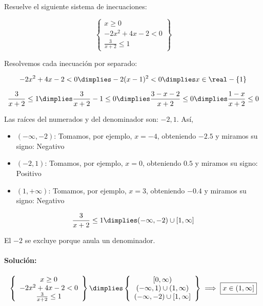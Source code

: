 \documentclass[palatino,nosec,nochap,nobuilddate]{Docencia}
\begin{document}
\begin{problem}
Resuelve el siguiente sistema de inecuaciones:

\[
	\left\{
		\begin{array}{c}
			x\geq 0\\
			-2x^2+4x-2<0\\
			\frac{3}{x+2}\leq 1
		\end{array}
	\right\}
\]

\solution

Resolvemos cada inecuación por separado:

$$
-2x^2+4x-2<0 \dimplies -2(x-1)^2 < 0 \dimplies x\in \real-\{1\}
$$

$$
	\frac{3}{x+2}\leq 1 \dimplies \frac{3}{x+2}- 1 \leq 0 \dimplies \frac{3-x-2}{x+2}\leq 0 \dimplies \frac{1-x}{x+2}\leq 0
$$

Las raíces del numerados y del denominador son: $-2,1$. Así,
\begin{itemize} 
	\item $\left( -\infty , -2 \right)$: Tomamos, por ejemplo, $x=-4$, obteniendo $-2.5$  y miramos su signo: Negativo 
	\item $\left( -2 , 1 \right)$: Tomamos, por ejemplo, $x=0$, obteniendo $0.5$  y miramos su signo: Positivo 
	\item $\left( 1 , +\infty \right)$: Tomamos, por ejemplo, $x=3$, obteniendo $-0.4$  y miramos su signo: Negativo
\end{itemize}

$$\frac{3}{x+2}\leq 1 \dimplies (-\infty,-2) \cup [1,\infty] $$

\obs El $-2$ se excluye porque anula un denominador.


\paragraph{Solución: }

\[
	\left\{
		\begin{array}{c}
			x\geq 0\\
			-2x^2+4x-2<0\\
			\frac{3}{x+2}\leq 1
		\end{array} 
	\right\}
	\dimplies
	\left\{
		\begin{array}{c}
			[0,\infty)\\
			(-\infty,1) \cup (1,\infty)\\
			(-\infty,-2) \cup [1,\infty] 
		\end{array} 
	\right\}
	\implies \boxed{x\in(1,\infty]}
\]

\end{problem}
\end{document}
